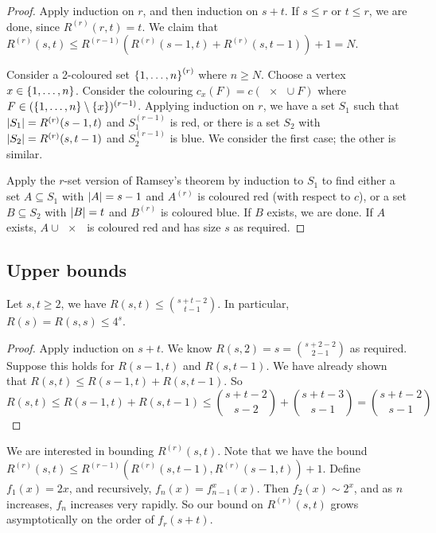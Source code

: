 \begin{proof}
	Apply induction on \( r \), and then induction on \( s + t \).
	If \( s \leq r \) or \( t \leq r \), we are done, since \( R^{(r)}(r,t) = t \).
	We claim that \( R^{(r)}(s,t) \leq R^{(r-1)}(R^{(r)}(s-1,t) + R^{(r)}(s,t-1)) + 1 = N \).

	Consider a 2-coloured set \( \qty{1, \dots, n}^{(r)} \) where \( n \geq N \).
	Choose a vertex \( x \in \qty{1, \dots, n} \).
	Consider the colouring \( c_x(F) = c(\qty{x} \cup F) \) where \( F \in (\qty{1, \dots, n} \setminus \qty{x})^{(r-1)} \).
	Applying induction on \( r \), we have a set \( S_1 \) such that \( \abs{S_1} = R^{(r)}(s-1,t) \) and \( S_1^{(r-1)} \) is red, or there is a set \( S_2 \) with \( \abs{S_2} = R^{(r)}(s,t-1) \) and \( S_2^{(r-1)} \) is blue.
	We consider the first case; the other is similar.

	Apply the \( r \)-set version of Ramsey's theorem by induction to \( S_1 \) to find either a set \( A \subseteq S_1 \) with \( \abs{A} = s - 1 \) and \( A^{(r)} \) is coloured red (with respect to \( c \)), or a set \( B \subseteq S_2 \) with \( \abs{B} = t \) and \( B^{(r)} \) is coloured blue.
	If \( B \) exists, we are done.
	If \( A \) exists, \( A \cup \qty{x} \) is coloured red and has size \( s \) as required.
\end{proof}

\subsection{Upper bounds}
\begin{proposition}
	Let \( s, t \geq 2 \), we have \( R(s,t) \leq \binom{s+t-2}{t-1} \).
	In particular, \( R(s) = R(s,s) \leq 4^s \).
\end{proposition}
\begin{proof}
	Apply induction on \( s + t \).
	We know \( R(s,2) = s = \binom{s+2-2}{2-1} \) as required.
	Suppose this holds for \( R(s-1,t) \) and \( R(s,t-1) \).
	We have already shown that \( R(s,t) \leq R(s-1,t) + R(s,t-1) \).
	So
	\[ R(s,t) \leq R(s-1,t) + R(s,t-1) \leq \binom{s+t-2}{s-2} + \binom{s+t-3}{s-1} = \binom{s+t-2}{s-1} \]
\end{proof}
We are interested in bounding \( R^{(r)}(s,t) \).
Note that we have the bound \( R^{(r)}(s,t) \leq R^{(r-1)}(R^{(r)}(s,t-1), R^{(r)}(s-1,t)) + 1 \).
Define \( f_1(x) = 2x \), and recursively, \( f_n(x) = f_{n-1}^x(x) \).
Then \( f_2(x) \sim 2^x \), and as \( n \) increases, \( f_n \) increases very rapidly.
So our bound on \( R^{(r)}(s,t) \) grows asymptotically on the order of \( f_r(s+t) \).

